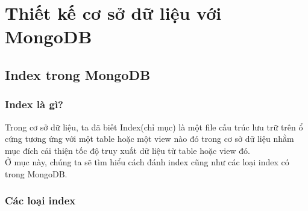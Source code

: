 \chapter{Thiết kế cơ sở dữ liệu với MongoDB}

\section{Index trong MongoDB}
\subsection{Index là gì?}
Trong cơ sở dữ liệu, ta đã biết Index(chỉ mục) là một file cấu trúc lưu trữ trên ổ cứng tương ứng với một table hoặc một view nào đó trong cơ sở dữ liệu nhằm mục đích cải thiện tốc độ truy xuất dữ liệu từ table hoặc view đó.\\
Ở mục này, chúng ta sẽ tìm hiểu cách đánh index cũng như các loại index có trong MongoDB.
\subsection{Các loại index}

